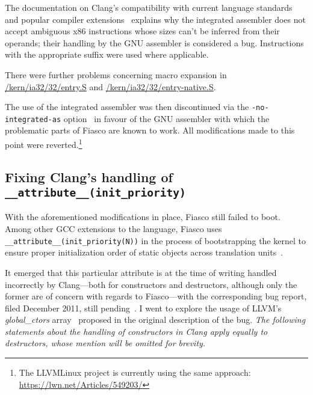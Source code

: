 The documentation on Clang's compatibility with current language standards and
popular compiler extensions~\cite[Inline assembly]{clang-compatibility}
explains why the integrated assembler does not accept ambiguous x86
instructions whose sizes can't be inferred from their operands; their handling
by the GNU assembler is considered a bug. Instructions with the appropriate
suffix were used where applicable.

There were further problems concerning macro expansion in
\url{/kern/ia32/32/entry.S} and \url{/kern/ia32/32/entry-native.S}.

The use of the integrated assembler was then discontinued via the
\texttt{-no-integrated-as} option~\cite{manclang} in favour of the GNU
assembler with which the problematic parts of Fiasco are known to work.  All
modifications made to this point were reverted.\footnote{The LLVMLinux project
is currently using the same approach: \url{https://lwn.net/Articles/549203/}}

\subsection{Fixing Clang's handling of \lstinline{__attribute__(init_priority)}}

With the aforementioned modifications in place, Fiasco still failed to boot. Among other GCC
extensions to the \CPP language, Fiasco uses
\lstinline{__attribute__(init_priority(N))} in the process of bootstrapping the kernel to ensure proper
initialization order of static objects across translation
units~\cite{gcc-initpriority}.

It emerged
that this particular attribute is at the time of writing handled incorrectly by
Clang—both for constructors and destructors, although only the former are of concern with regards to Fiasco—with the corresponding
bug report, filed December 2011, still
pending~\cite{initpriority-bug}. I went to explore the usage of LLVM's
\emph{global\_ctors} array~\cite[The llvm.global\_ctors global
variable]{langref} proposed in the original description of the bug. \emph{The
following statements about the handling of constructors
in Clang apply equally to destructors, whose mention will be omitted for
brevity.}


